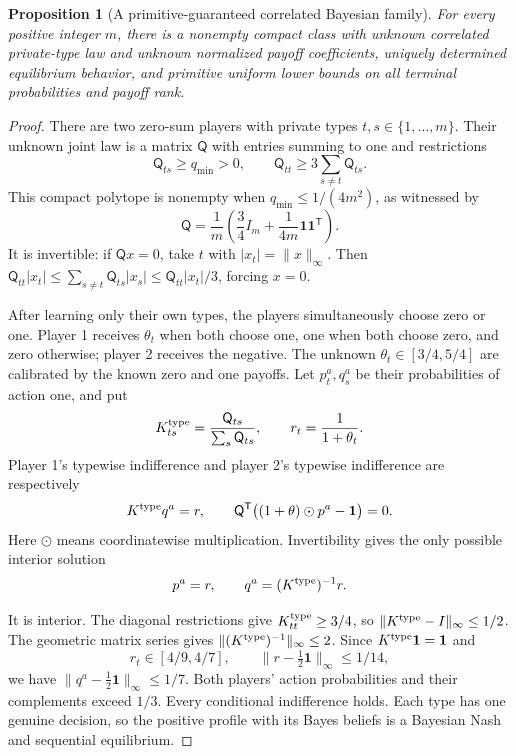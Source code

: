 \documentclass[11pt,a4paper]{article}
\numberwithin{equation}{section}
\newtheorem{proposition}[theorem]{Proposition}
\theoremstyle{definition}
\begin{document}
\begin{proposition}[A primitive-guaranteed correlated Bayesian family]
\label{prop:bayesian}
For every positive integer \(m\), there is a nonempty compact class
with unknown correlated private-type law and unknown normalized payoff
coefficients, uniquely determined equilibrium behavior, and primitive
uniform lower bounds on all terminal probabilities and payoff rank.
\end{proposition}
\begin{proof}
There are two zero-sum players with private types \(t,s\in\{1,\ldots,m\}\).
Their unknown joint law is a matrix \(\mathsf Q\) with entries summing
to one and restrictions
\begin{equation}\label{eq:typeclass}
 \mathsf Q_{ts}\ge q_{\min}>0,\qquad
 \mathsf Q_{tt}\ge3\sum_{s\ne t}\mathsf Q_{ts}.
\end{equation}
This compact polytope is nonempty when
\(q_{\min}\le1/(4m^2)\), as witnessed by
\[
 \mathsf Q=\frac1m\left(\frac34 I_m+
                           \frac1{4m}\mathbf1\mathbf1^{\mathsf T}\right).
\]
It is invertible: if \(\mathsf Qx=0\), take \(t\) with
\(|x_t|=\|x\|_\infty\). Then
\(\mathsf Q_{tt}|x_t|
 \le\sum_{s\ne t}\mathsf Q_{ts}|x_s|
 \le\mathsf Q_{tt}|x_t|/3\), forcing \(x=0\).

After learning only their own types, the players simultaneously choose
zero or one. Player 1 receives \(\theta_t\) when both choose one,
one when both choose zero, and zero otherwise; player 2 receives
the negative. The unknown \(\theta_t\in[3/4,5/4]\) are calibrated
by the known zero and one payoffs.
Let \(p^a_t,q^a_s\) be their probabilities of action one, and put
\[
 K^{\rm type}_{ts}=\frac{\mathsf Q_{ts}}{\sum_s\mathsf Q_{ts}},
 \qquad r_t=\frac1{1+\theta_t}.
\]
Player 1's typewise indifference and player 2's typewise indifference
are respectively
\begin{equation}\label{eq:bayesindifference}
 K^{\rm type}q^a=r,\qquad
 \mathsf Q^{\mathsf T}
       \big((1+\theta)\mathbin{\odot}p^a-\mathbf1\big)=0 .
\end{equation}
Here \(\odot\) means coordinatewise multiplication. Invertibility gives
the only possible interior solution
\begin{equation}\label{eq:bayesbehavior}
 p^a=r,\qquad q^a=(K^{\rm type})^{-1}r .
\end{equation}

It is interior. The diagonal restrictions give
\(K^{\rm type}_{tt}\ge3/4\), so
\(\|K^{\rm type}-I\|_\infty\le1/2\).
The geometric matrix series gives
\(\|(K^{\rm type})^{-1}\|_\infty\le2\).
Since \(K^{\rm type}\mathbf1=\mathbf1\) and
\[
 r_t\in[4/9,4/7],\qquad
 \|r-\tfrac12\mathbf1\|_\infty\le1/14,
\]
we have \(\|q^a-\tfrac12\mathbf1\|_\infty\le1/7\).
Both players' action probabilities and their complements exceed \(1/3\).
Every conditional indifference holds. Each type has one genuine
decision, so the positive profile with its Bayes beliefs is a Bayesian
Nash and sequential equilibrium.


\end{proof}
\end{document}
